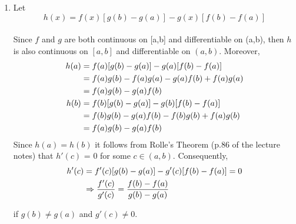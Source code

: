 \documentclass[12pt]{amsart}
\begin{document}
\begin{enumerate}
		
		
		
	\item Let $$h(x)=f(x)[g(b)-g(a)]-g(x)[f(b)-f(a)]$$
	\\
	Since $f$ and $g$ are both continuous on [a,b] and differentiable on (a,b), then $h$ is also continuous 		on $[a,b]$ and differentiable on $(a,b)$. Moreover,
		\begin{align}
			h(a) & = f(a)[g(b)-g(a)]-g(a)[f(b)-f(a)] \notag \\
			& = f(a)g(b)-f(a)g(a)-g(a)f(b)+f(a)g(a) \notag \\
			& = f(a)g(b)-g(a)f(b) \notag \\
			h(b) & =  f(b)[g(b)-g(a)]-g(b)[f(b)-f(a)] \notag \\
			& = f(b)g(b)-g(a)f(b)-f(b)g(b)+f(a)g(b) \notag \\
			&= f(a)g(b)-g(a)f(b) \notag 
		\end{align}
	Since $h(a)=h(b)$ it follows from Rolle's Theorem (p.86 of the lecture notes) that $h'(c)$ = 0 for some $c 	\in (a,b)$. Consequently,
		\begin{align}
			h'(c) & = f'(c)[g(b)-g(a)]-g'(c)[f(b)-f(a)] = 0 \notag \\
			& \Rightarrow \frac{f'(c)}{g'(c)}=\frac{f(b)-f(a)}{g(b)-g(a)} \notag
		\end{align}
	
	\hspace{3.3cm} if $g(b) \ne g(a)$ and $g'(c) \ne 0$.
				
\end{enumerate}
	
\end{document}
